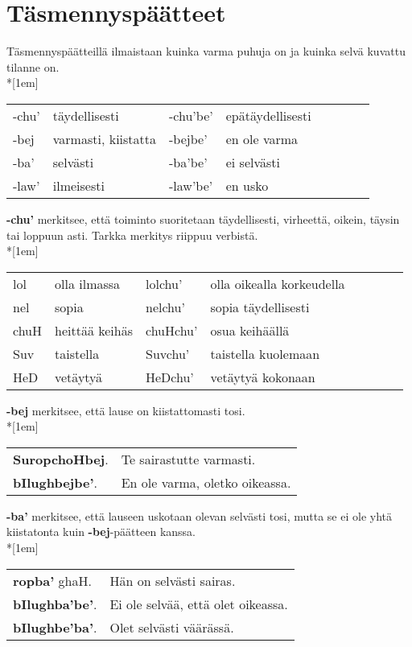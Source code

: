 \documentclass{book}
\begin{document}
\section{Täsmennyspäätteet}
\label{sec:tasmennys}

Täsmennyspäätteillä ilmaistaan kuinka varma puhuja on ja kuinka selvä kuvattu tilanne on.\\*[1em]
\begin{tabular}{Bl Il | Bl Il}
    -chu' & täydellisesti & -chu'be' & epätäydellisesti \\
    -bej & varmasti, kiistatta & -bejbe' & en ole varma \\
    -ba' & selvästi & -ba'be' & ei selvästi \\
    -law' & ilmeisesti & -law'be' & en usko \\
\end{tabular}

\textbf{-chu'} merkitsee, että toiminto suoritetaan täydellisesti, virheettä, oikein, täysin tai loppuun asti. Tarkka merkitys riippuu verbistä.\\*[1em]
\begin{tabular}{Bl Il | Bl Il}
    lol & olla ilmassa & lolchu' & olla oikealla korkeudella \\
    nel & sopia & nelchu' & sopia täydellisesti \\
    chuH & heittää keihäs & chuHchu' & osua keihäällä \\
    Suv & taistella & Suvchu' & taistella kuolemaan \\
    HeD & vetäytyä & HeDchu' & vetäytyä kokonaan \\
\end{tabular}

\textbf{-bej} merkitsee, että lause on kiistattomasti tosi.\\*[1em]
\begin{tabular}{l l}
    \textbf{SuropchoHbej}. & Te sairastutte varmasti. \\
    \textbf{bIlughbejbe'}. & En ole varma, oletko oikeassa. \\
\end{tabular}

\textbf{-ba'} merkitsee, että lauseen uskotaan olevan selvästi tosi, mutta se ei ole yhtä kiistatonta kuin \textbf{-bej}-päätteen kanssa.\\*[1em]
\begin{tabular}{l l}
    \textbf{ropba'} ghaH. & Hän on selvästi sairas. \\
    \textbf{bIlughba'be'}. & Ei ole selvää, että olet oikeassa. \\
    \textbf{bIlughbe'ba'}. & Olet selvästi väärässä. \\
\end{tabular}
\end{document}
